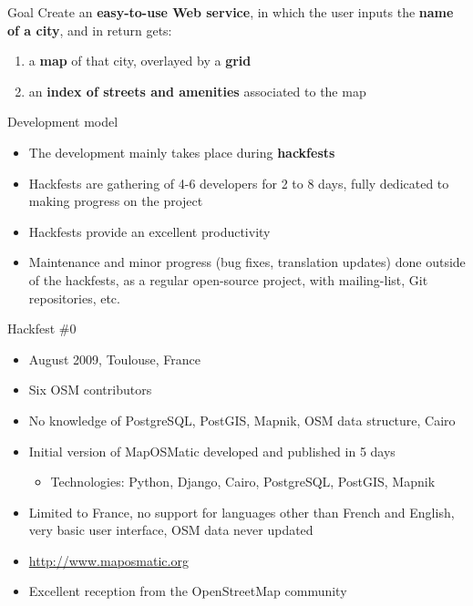 \documentclass{beamer}
\begin{document}
\begin{frame}{Goal}
  \Large
  Create an {\bf easy-to-use Web service}, in which the user inputs
  the {\bf name of a city}, and in return gets:
  \begin{enumerate}
  \item a {\bf map} of that city, overlayed by a {\bf grid}
  \item an {\bf index of streets and amenities} associated to the map
  \end{enumerate}
\end{frame}

\begin{frame}{Development model}
  \begin{itemize}
  \item The development mainly takes place during {\bf hackfests}
  \item Hackfests are gathering of 4-6 developers for 2 to 8 days,
    fully dedicated to making progress on the project
  \item Hackfests provide an excellent productivity
  \item Maintenance and minor progress (bug fixes, translation
    updates) done outside of the hackfests, as a regular open-source
    project, with mailing-list, Git repositories, etc.
  \end{itemize}
\end{frame}

\begin{frame}{Hackfest \#0}
  \begin{itemize}
  \item August 2009, Toulouse, France
  \item Six OSM contributors
  \item No knowledge of PostgreSQL, PostGIS, Mapnik, OSM data
    structure, Cairo
  \item Initial version of MapOSMatic developed and published in 5 days
    \begin{itemize}
    \item Technologies: Python, Django, Cairo, PostgreSQL, PostGIS, Mapnik
    \end{itemize}
  \item Limited to France, no support for languages other than French
    and English, very basic user interface, OSM data never updated
  \item \url{http://www.maposmatic.org}
  \item Excellent reception from the OpenStreetMap community
  \end{itemize}
\end{frame}
\end{document}
